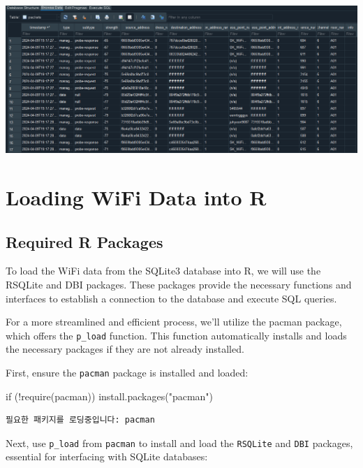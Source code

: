 \documentclass[
  letterpaper,
]{scrbook}
\newenvironment{Shaded}{\begin{snugshade}}{\end{snugshade}}
\newcommand{\ControlFlowTok}[1]{\textcolor[rgb]{0.00,0.23,0.31}{#1}}
\newcommand{\FunctionTok}[1]{\textcolor[rgb]{0.28,0.35,0.67}{#1}}
\newcommand{\NormalTok}[1]{\textcolor[rgb]{0.00,0.23,0.31}{#1}}
\newcommand{\SpecialCharTok}[1]{\textcolor[rgb]{0.37,0.37,0.37}{#1}}
\newcommand{\StringTok}[1]{\textcolor[rgb]{0.13,0.47,0.30}{#1}}
\begin{document}
\includegraphics{content/material/ch3/sqlite3_browser.png}

\hypertarget{loading-wifi-data-into-r}{%
\section{Loading WiFi Data into R}\label{loading-wifi-data-into-r}}

\hypertarget{required-r-packages}{%
\subsection{Required R Packages}\label{required-r-packages}}

To load the WiFi data from the SQLite3 database into R, we will use the
RSQLite and DBI packages. These packages provide the necessary functions
and interfaces to establish a connection to the database and execute SQL
queries.

For a more streamlined and efficient process, we'll utilize the pacman
package, which offers the \texttt{p\_load} function. This function
automatically installs and loads the necessary packages if they are not
already installed.

First, ensure the \texttt{pacman} package is installed and loaded:

\begin{Shaded}
\begin{Highlighting}[]
\ControlFlowTok{if}\NormalTok{ (}\SpecialCharTok{!}\FunctionTok{require}\NormalTok{(pacman)) }\FunctionTok{install.packages}\NormalTok{(}\StringTok{"pacman"}\NormalTok{)}
\end{Highlighting}
\end{Shaded}

\begin{verbatim}
필요한 패키지를 로딩중입니다: pacman
\end{verbatim}

Next, use \texttt{p\_load} from \texttt{pacman} to install and load the
\texttt{RSQLite} and \texttt{DBI} packages, essential for interfacing
with SQLite databases:
\end{document}

